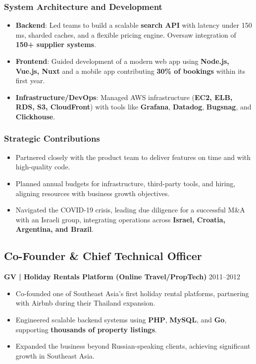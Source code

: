 \documentclass[11pt,a4paper]{article}
\begin{document}
\subsubsection*{System Architecture and Development}
\begin{itemize}
    \item \textbf{Backend}: Led teams to build a scalable \textbf{search API} with latency under 150 ms, sharded caches, and a flexible pricing engine. Oversaw integration of \textbf{150+ supplier systems}.
    \item \textbf{Frontend}: Guided development of a modern web app using \textbf{Node.js, Vue.js, Nuxt} and a mobile app contributing \textbf{30\% of bookings} within its first year.
    \item \textbf{Infrastructure/DevOps}: Managed AWS infrastructure (\textbf{EC2, ELB, RDS, S3, CloudFront}) with tools like \textbf{Grafana}, \textbf{Datadog}, \textbf{Bugsnag}, and \textbf{Clickhouse}.
\end{itemize}

\subsubsection*{Strategic Contributions}
\begin{itemize}
    \item Partnered closely with the product team to deliver features on time and with high-quality code.
    \item Planned annual budgets for infrastructure, third-party tools, and hiring, aligning resources with business growth objectives.
    \item Navigated the COVID-19 crisis, leading due diligence for a successful M\&A with an Israeli group, integrating operations across \textbf{Israel, Croatia, Argentina, and Brazil}.
\end{itemize}

\subsection*{Co-Founder \& Chief Technical Officer}
\textbf{GV | Holiday Rentals Platform (Online Travel/PropTech)} \hfill 2011--2012
\begin{itemize}
    \item Co-founded one of Southeast Asia’s first holiday rental platforms, partnering with Airbnb during their Thailand expansion.
    \item Engineered scalable backend systems using \textbf{PHP}, \textbf{MySQL}, and \textbf{Go}, supporting \textbf{thousands of property listings}.
    \item Expanded the business beyond Russian-speaking clients, achieving significant growth in Southeast Asia.
\end{itemize}
\end{document}
